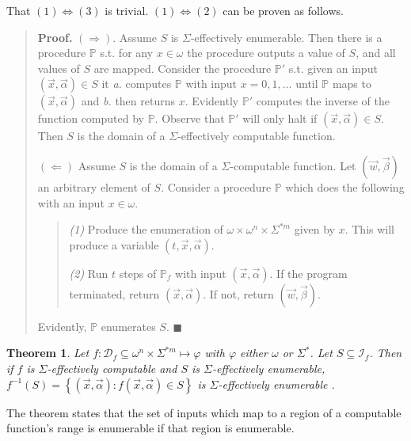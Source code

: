 \documentclass[a4paper, 12pt]{article}
\newtheorem{theorem}{Theorem}
\newtheorem{theorem}{Theorem}
\begin{document}
That $(1) \Leftrightarrow (3)$ is trivial. $(1) \Leftrightarrow (2)$ can be proven as
follows. 


\small
\begin{quote}

\textbf{Proof.} $(\Rightarrow)$. Assume $S$ is $\Sigma$-effectively enumerable.
Then there is a procedure $\mathbb{P}$ s.t. for any $x \in  \omega$ the
procedure outputs a value of $S$, and all values of $S$ are mapped. Consider the
procedure $\mathbb{P}'$ s.t. given an input $(\vec{x}, \vec{\alpha}) \in S$ it
\textit{a.} computes $\mathbb{P}$ with input  $x = 0, 1, \ldots$ until
$\mathbb{P}$ maps to $(\vec{x}, \vec{\alpha})$ and \textit{b.} then returns $x$.
Evidently $\mathbb{P}'$ computes the inverse of the function computed by
$\mathbb{P}$. Observe that $\mathbb{P}'$ will only halt if $(\vec{x},
\vec{\alpha}) \in S$. Then $S$ is the domain of a $\Sigma$-effectively
computable function.

$(\Leftarrow)$ Assume $S$ is the domain of a $\Sigma$-computable function. Let 
$(\vec{w}, \vec{\beta})$ an arbitrary element of $S$. Consider a procedure
$\mathbb{P}$ which does the following with an input $x \in \omega$.

\begin{quote}
    \textit{(1)} Produce the enumeration of $\omega \times \omega^{n} \times
    \Sigma^{*m} $ given by $x$. This will produce a variable $(t, \vec{x},
    \vec{\alpha})$.

    \textit{(2)} Run $t$ steps of $\mathbb{P}_f$ with input $(\vec{x},
    \vec{\alpha}) $. If the program terminated, return $(\vec{x},
    \vec{\alpha})$. If not, return $(\vec{w}, \vec{\beta})$.
\end{quote}

Evidently, $\mathbb{P}$ enumerates $S$. $\blacksquare$

\end{quote}
\normalsize

\begin{theorem}
    Let $f : \mathcal{D}_f \subseteq \omega^{n} \times \Sigma^{*m} \mapsto \varphi$ with
    $\varphi$ either $\omega$ or $\Sigma^{*}$. Let $S \subseteq \mathcal{I}_f$.
    Then if $f$ is $\Sigma$-effectively computable and $S$ is
    $\Sigma$-effectively enumerable, $f^{-1}(S) = \left\{ (\vec{x},
    \vec{\alpha}) : f(\vec{x}, \vec{\alpha}) \in S \right\} $ is
    $\Sigma$-effectively enumerable .
\end{theorem}

The theorem states that the set of inputs which map to a region of a computable
function's range is enumerable if that region is enumerable.
\end{document}
